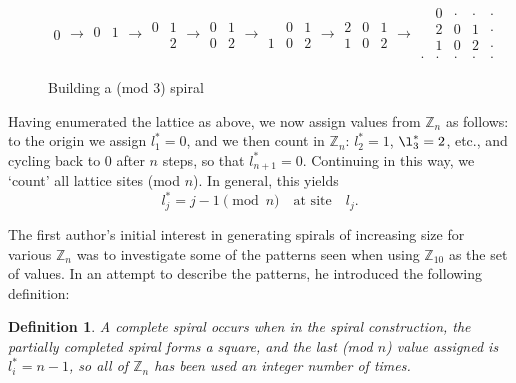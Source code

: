 \documentclass[11pt,reqno]{amsart}
\theoremstyle{mydef}
\newtheorem{definition}{Definition}
\def\ZZ{\mathbb{Z}}
\begin{document}
\begin{figure}[h]
\[  \begin{array}{c}
\boxed{0}
\end{array} 
\rightarrow
%
\begin{array}{cc}
\boxed{0} & 1 \\
\  & \ 
\end{array}
\rightarrow
\begin{array}{cc}
\boxed{0} & 1 \\
\  & 2
\end{array}
\rightarrow
\begin{array}{cc}
\boxed{0} & 1 \\
0 & 2
\end{array}
\rightarrow
\begin{array}{ccc}
\  & \boxed{0} & 1 \\
1 & 0 & 2
\end{array}
\rightarrow
\begin{array}{ccc}
2 & \boxed{0} & 1 \\
1 & 0 & 2
\end{array}
\rightarrow
\begin{array}{ccccc}
\  & 0 & \cdot  & \cdot & \cdot \\
\  & 2 & \boxed{0} & 1 & \cdot \\
\  & 1 & 0 & 2 & \cdot \\
\cdot & \cdot & \cdot & \cdot & \cdot
\end{array}
\]
\caption{Building a (mod 3) spiral}
\label{fig:mod3spiral}
\end{figure}

Having enumerated the lattice as above, we now assign values from
$\ZZ_n$ as follows: to the origin we assign $l_1^* = 0$, and we then
count in $\ZZ_n$: $l_2^* = 1$, $\l_3^* = 2$, etc., and cycling back to
$0$ after $n$ steps, so that $l_{n+1}^* = 0$.  Continuing in this way,
we `count' all lattice sites (mod $n$).  In general, this yields
\[
  l_j^* = j-1 \!\!\!\pmod n \quad\text{at site}\quad l_j.
\]




The first author's initial interest in generating spirals of
increasing size for various $\ZZ_n$ was to investigate some of the
patterns seen when using $\ZZ_{10}$ as the set of values.  In an attempt to describe
the patterns, he introduced the following definition:



\begin{definition}%
  A \emph{complete spiral} occurs when in the spiral construction, the
  partially completed spiral forms a square, and the last (mod $n$)
  value assigned is $l^*_i = n-1$, so all of $\ZZ_n$ has been used an
  integer number of times.
\end{definition}
\end{document}
